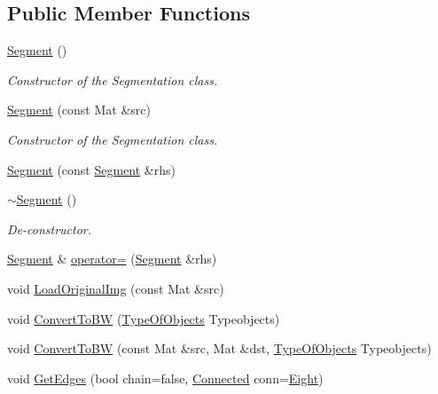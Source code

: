 \subsection*{Public Member Functions}
\begin{DoxyCompactItemize}
\item 
\hyperlink{class_vision_1_1_segment_adfe9fc7ffcc7269f961d4b1f6720d1e8}{Segment} ()
\begin{DoxyCompactList}\small\item\em Constructor of the Segmentation class. \end{DoxyCompactList}\item 
\hyperlink{class_vision_1_1_segment_ad3c4765e0e519f8d5fc7ac2e567608ee}{Segment} (const Mat \&src)
\begin{DoxyCompactList}\small\item\em Constructor of the Segmentation class. \end{DoxyCompactList}\item 
\hyperlink{class_vision_1_1_segment_a365b40b1f7886344c063c881c5cd27ca}{Segment} (const \hyperlink{class_vision_1_1_segment}{Segment} \&rhs)
\item 
\hyperlink{class_vision_1_1_segment_a76b45a453304f1f485e3bc2fcad58b59}{$\sim$\+Segment} ()
\begin{DoxyCompactList}\small\item\em De-\/constructor. \end{DoxyCompactList}\item 
\hyperlink{class_vision_1_1_segment}{Segment} \& \hyperlink{class_vision_1_1_segment_a1bfc12c503f6e07cca595ec884273e13}{operator=} (\hyperlink{class_vision_1_1_segment}{Segment} \&rhs)
\item 
void \hyperlink{class_vision_1_1_segment_a8b5edc7f5a69d961e47f61a2191b8745}{Load\+Original\+Img} (const Mat \&src)
\item 
void \hyperlink{class_vision_1_1_segment_a4272ceb22f9cb20c6f65d9536149d3c0}{Convert\+To\+B\+W} (\hyperlink{class_vision_1_1_segment_ac3ddf2c72ee6333007510b680db1e7dd}{Type\+Of\+Objects} Typeobjects)
\item 
void \hyperlink{class_vision_1_1_segment_a513af00e29683fa172ce1844ffd7f98f}{Convert\+To\+B\+W} (const Mat \&src, Mat \&dst, \hyperlink{class_vision_1_1_segment_ac3ddf2c72ee6333007510b680db1e7dd}{Type\+Of\+Objects} Typeobjects)
\item 
void \hyperlink{class_vision_1_1_segment_ad002015511d2d8a4d42106c14e163623}{Get\+Edges} (bool chain=false, \hyperlink{class_vision_1_1_segment_a330240c08320e72270fac0aa83d5e27e}{Connected} conn=\hyperlink{class_vision_1_1_segment_a330240c08320e72270fac0aa83d5e27eae8e2b0fa6d15448f10cddc0390284a39}{Eight})

\end{DoxyCompactItemize}
